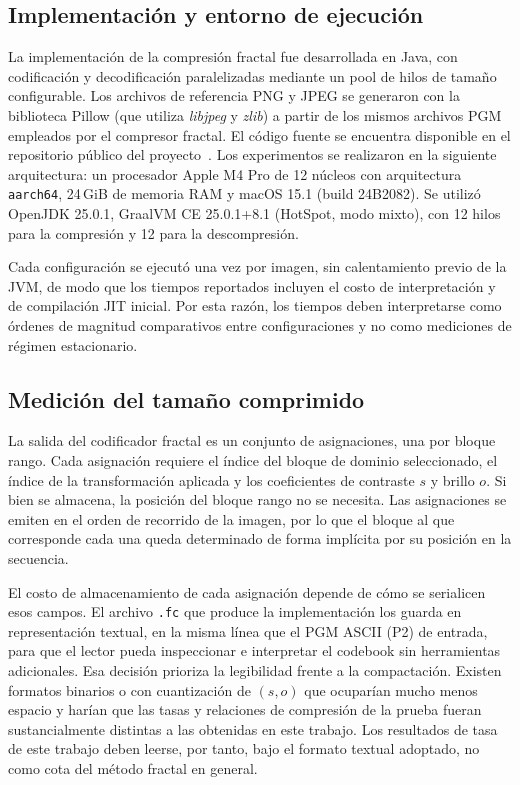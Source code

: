 \documentclass[a4paper]{llncs}
\begin{document}
\subsection{Implementación y entorno de ejecución}
\label{sec:entorno_ejecucion}

La implementación de la compresión fractal fue desarrollada en Java, con codificación y decodificación paralelizadas mediante un pool de hilos de tamaño configurable. Los archivos de referencia PNG y JPEG se generaron con la biblioteca Pillow (que utiliza \textit{libjpeg} y \textit{zlib}) a partir de los mismos archivos PGM empleados por el compresor fractal. El código fuente se encuentra disponible en el repositorio público del proyecto~\cite{madeoRepositorio}. Los experimentos se realizaron en la siguiente arquitectura: un procesador Apple M4 Pro de 12 núcleos con arquitectura \texttt{aarch64}, 24\,GiB de memoria RAM y macOS 15.1 (build 24B2082). Se utilizó OpenJDK 25.0.1, GraalVM CE 25.0.1+8.1 (HotSpot, modo mixto), con 12 hilos para la compresión y 12 para la descompresión.

Cada configuración se ejecutó una vez por imagen, sin calentamiento previo de la JVM, de modo que los tiempos reportados incluyen el costo de interpretación y de compilación JIT inicial. Por esta razón, los tiempos deben interpretarse como órdenes de magnitud comparativos entre configuraciones y no como mediciones de régimen estacionario.

\subsection{Medición del tamaño comprimido}
\label{sec:tamano_comprimido}

La salida del codificador fractal es un conjunto de asignaciones, una por bloque rango. Cada asignación requiere el índice del bloque de dominio seleccionado, el índice de la transformación aplicada y los coeficientes de contraste $s$ y brillo $o$. Si bien se almacena, la posición del bloque rango no se necesita. Las asignaciones se emiten en el orden de recorrido de la imagen, por lo que el bloque al que corresponde cada una queda determinado de forma implícita por su posición en la secuencia.

El costo de almacenamiento de cada asignación depende de cómo se serialicen esos campos. El archivo \texttt{.fc} que produce la implementación los guarda en representación textual, en la misma línea que el PGM ASCII (P2) de entrada, para que el lector pueda inspeccionar e interpretar el codebook sin herramientas adicionales. Esa decisión prioriza la legibilidad frente a la compactación. Existen formatos binarios o con cuantización de $(s,o)$ que ocuparían mucho menos espacio y harían que las tasas y relaciones de compresión de la prueba fueran sustancialmente distintas a las obtenidas en este trabajo. Los resultados de tasa de este trabajo deben leerse, por tanto, bajo el formato textual adoptado, no como cota del método fractal en general.
\end{document}
